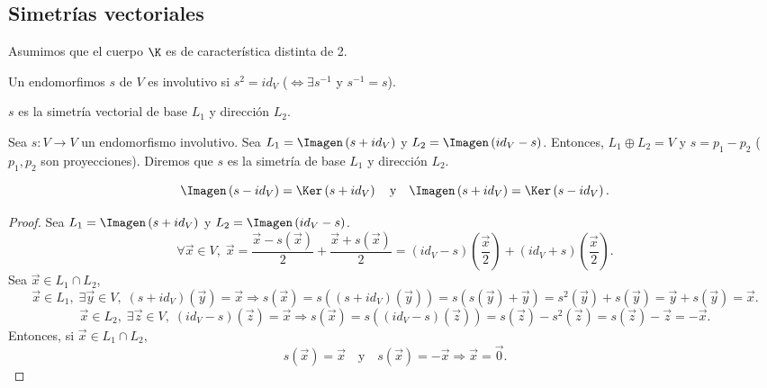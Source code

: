 \subsection{Simetrías vectoriales}
Asumimos que el cuerpo $\displaystyle \K $ es de característica distinta de 2. 
\begin{fdefinition}[]
\normalfont Un endomorfimos $\displaystyle s $ de $\displaystyle V $ es involutivo si $\displaystyle s^{2} = id _{V} $ ($\displaystyle \iff \exists s^{-1} $ y $\displaystyle s^{-1} = s $). 
\end{fdefinition}

\begin{fdefinition}[]
\normalfont $\displaystyle s $ es la simetría vectorial de base $\displaystyle L_{1} $ y dirección $\displaystyle L_{2} $.
\end{fdefinition}

\begin{ftheorem}[]
\normalfont Sea $\displaystyle s : V \to V $ un endomorfismo involutivo. Sea $\displaystyle L_{1} = \Imagen\left(s + id _{V}\right) $ y $\displaystyle L_{2} = \Imagen\left(id _{V}-s\right) $. Entonces, $\displaystyle L_{1} \oplus L_{2} = V $ y $\displaystyle s = p_{1}- p_{2} $ ($\displaystyle p_{1}, p_{2} $ son proyecciones). Diremos que $\displaystyle s $  es la simetría de base $\displaystyle L_{1} $ y dirección $\displaystyle L_{2} $.
\end{ftheorem}
\[\Imagen\left(s - id _{V}\right) = \Ker\left(s+ id _{V}\right) \quad \text{y} \quad \Imagen\left(s + id _{V}\right) = \Ker\left(s - id _{V}\right) .\]

\begin{proof}
Sea $\displaystyle L_{1} = \Imagen\left(s + id _{ V}\right) $ y $\displaystyle L_{2} = \Imagen\left(id _{V}-s\right) $.
\[\forall \vec{x} \in V, \; \vec{x} = \frac{ \vec{x} - s\left(\vec{x}\right)}{2} + \frac{ \vec{x} + s\left(\vec{x}\right)}{2} = \left(id _{V}- s\right)\left(\frac{\vec{x}}{2}\right) + \left(id _{V} + s\right)\left(\frac{\vec{x}}{2}\right) .\]
Sea $\displaystyle \vec{x} \in L_{1} \cap L_{2} $, 
\[\vec{x}\in L_{1}, \;\exists \vec{y} \in V, \; \left(s+ id _{V}\right)\left(\vec{y}\right) = \vec{x} \Rightarrow s\left(\vec{x}\right) = s\left(\left(s+id _{V}\right)\left(\vec{y}\right)\right) = s\left(s\left(\vec{y}\right)+\vec{y}\right) = s^{2}\left(\vec{y}\right) + s\left(\vec{y}\right) = \vec{y}+s\left(\vec{y}\right) = \vec{x}.\]
\[\vec{x} \in L_{2}, \; \exists \vec{z} \in V, \; \left(id _{V}-s\right)\left(\vec{z}\right) = \vec{x} \Rightarrow s\left(\vec{x}\right) = s\left(\left(id _{V}-s\right)\left(\vec{z}\right)\right) = s\left(\vec{z}\right) - s^{2}\left(\vec{z}\right) = s\left(\vec{z}\right)-\vec{z} = - \vec{x} .\]
Entonces, si $\displaystyle  \vec{x} \in L_{1} \cap L_{2} $, 
\[ s\left(\vec{x}\right) = \vec{x} \quad \text{y} \quad s\left(\vec{x}\right) = - \vec{x} \Rightarrow \vec{x} = \vec{0} .\]
\end{proof}

